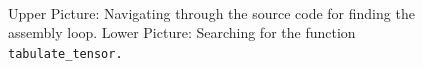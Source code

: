 \begin{figure}
   \\
\caption{Upper Picture: Navigating through the source code for finding the assembly loop.
         Lower Picture: Searching for the function \texttt{tabulate\_tensor.} }
\label{figure34}
\end{figure}

